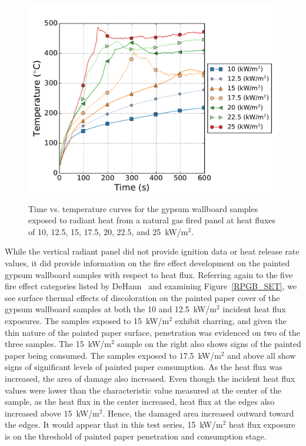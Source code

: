 \documentclass[twoside]{uocthesis}
\begin{document}
{\begin{figure}[p]
	\centering
	\includegraphics[width=\textwidth]{../Figures/RP_GB_Front} \\
	\caption[Time vs. temperature curves for the gypsum wallboard samples exposed to radiant heat from a natural gas fired panel]{Time vs. temperature curves for the gypsum wallboard samples exposed to radiant heat from a natural gas fired panel at heat fluxes of 10, 12.5, 15, 17.5, 20, 22.5, and 25~kW/m$^2$.}
	\label{RP_GB_Front}
\end{figure}

While the vertical radiant panel did not provide ignition data or heat release rate values, it did provide information on the fire effect development on the painted gypsum wallboard samples with respect to heat flux.  Referring again to the five fire effect categories listed by DeHann~\cite{DeHaan:2012} and examining Figure~\ref{RPGB_SET}, we see surface thermal effects of discoloration on the painted paper cover of the gypsum wallboard samples at both the 10 and 12.5~kW/m$^2$ incident heat flux exposures.  The samples exposed to 15~kW/m$^2$ exhibit charring, and given the thin nature of the painted paper surface, penetration was evidenced on two of the three samples.  The 15~kW/m$^2$ sample on the right also shows signs of the painted paper being consumed.  The samples exposed to 17.5~kW/m$^2$ and above all show signs of significant levels of painted paper consumption.  As the heat flux was increased, the area of damage also increased. Even though the incident heat flux values were lower than the characteristic value measured at the center of the sample, as the heat flux in the center increased, heat flux at the edges also increased above 15~kW/m$^2$. Hence, the damaged area increased outward toward the edges. It would appear that in this test series, 15~kW/m$^2$ heat flux exposure is on the threshold of painted paper penetration and consumption stage.            

}
\end{document}

